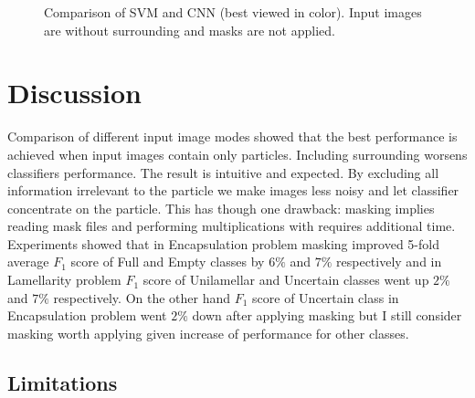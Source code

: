 \documentclass[a4paper, 11pt, table]{article}
\begin{document}
\begin{landscape}
\begin{figure}
\caption{\label{fig:svm_vs_cnn} Comparison of SVM and CNN (best viewed in color). Input images are without surrounding and masks are not applied.}
\end{figure}
 
\end{landscape}

\section{Discussion}

Comparison of different input image modes showed that the best performance is achieved when input images contain only particles. Including surrounding worsens classifiers performance. The result is intuitive and expected. By excluding all information irrelevant to the particle we make images less noisy and let classifier concentrate on the particle. This has though one drawback: masking implies reading mask files and performing multiplications with requires additional time. Experiments showed that in Encapsulation problem masking improved 5-fold average $F_1$ score of Full and Empty classes by $6\%$ and $7\%$ respectively and in Lamellarity problem $F_1$ score of Unilamellar and Uncertain classes went up $2\%$ and $7\%$ respectively. On the other hand $F_1$ score of Uncertain class in Encapsulation problem went $2\%$ down after applying masking but I still consider masking worth applying given increase of performance for other classes.

\subsection{Limitations}
\end{document}

